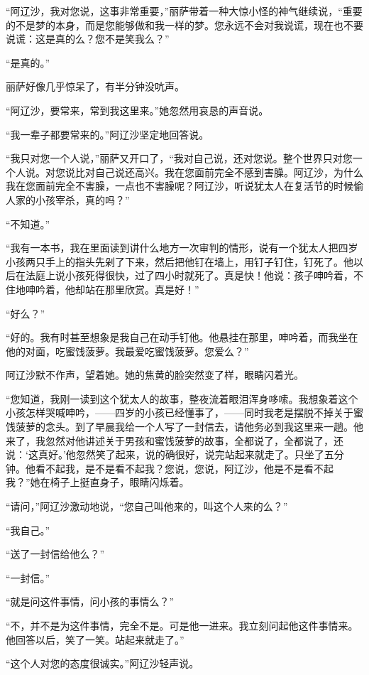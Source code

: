 \par “阿辽沙，我对您说，这事非常重要，”丽萨带着一种大惊小怪的神气继续说，“重要的不是梦的本身，而是您能够做和我一样的梦。您永远不会对我说谎，现在也不要说谎：这是真的么？您不是笑我么？”
\par “是真的。”
\par 丽萨好像几乎惊呆了，有半分钟没吭声。
\par “阿辽沙，要常来，常到我这里来。”她忽然用哀恳的声音说。
\par “我一辈子都要常来的。”阿辽沙坚定地回答说。
\par “我只对您一个人说，”丽萨又开口了，“我对自己说，还对您说。整个世界只对您一个人说。对您说比对自己说还高兴。我在您面前完全不感到害臊。阿辽沙，为什么我在您面前完全不害臊，一点也不害臊呢？阿辽沙，听说犹太人在复活节的时候偷人家的小孩宰杀，真的吗？”
\par “不知道。”
\par “我有一本书，我在里面读到讲什么地方一次审判的情形，说有一个犹太人把四岁小孩两只手上的指头先剁了下来，然后把他钉在墙上，用钉子钉住，钉死了。他以后在法庭上说小孩死得很快，过了四小时就死了。真是快！他说：孩子呻吟着，不住地呻吟着，他却站在那里欣赏。真是好！”
\par “好么？”
\par “好的。我有时甚至想象是我自己在动手钉他。他悬挂在那里，呻吟着，而我坐在他的对面，吃蜜饯菠萝。我最爱吃蜜饯菠萝。您爱么？”
\par 阿辽沙默不作声，望着她。她的焦黄的脸突然变了样，眼睛闪着光。
\par “您知道，我刚一读到这个犹太人的故事，整夜流着眼泪浑身哆嗦。我想象着这个小孩怎样哭喊呻吟，——四岁的小孩已经懂事了，——同时我老是摆脱不掉关于蜜饯菠萝的念头。到了早晨我给一个人写了一封信去，请他务必到我这里来一趟。他来了，我忽然对他讲述关于男孩和蜜饯菠萝的故事，全都说了，全都说了，还说：‘这真好。’他忽然笑了起来，说的确很好，说完站起来就走了。只坐了五分钟。他看不起我，是不是看不起我？您说，您说，阿辽沙，他是不是看不起我？”她在椅子上挺直身子，眼睛闪烁着。
\par “请问，”阿辽沙激动地说，“您自己叫他来的，叫这个人来的么？”
\par “我自己。”
\par “送了一封信给他么？”
\par “一封信。”
\par “就是问这件事情，问小孩的事情么？”
\par “不，并不是为这件事情，完全不是。可是他一进来。我立刻问起他这件事情来。他回答以后，笑了一笑。站起来就走了。”
\par “这个人对您的态度很诚实。”阿辽沙轻声说。
